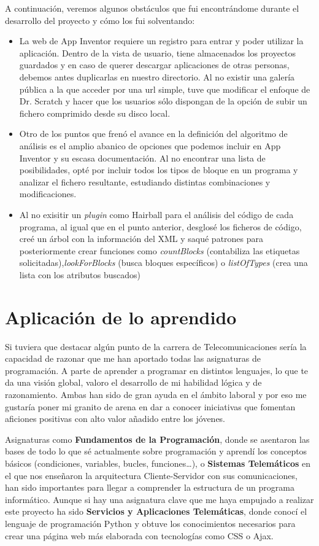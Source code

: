 \documentclass[a4paper, 12pt]{book}
\begin{document}
A continuación, veremos algunos obstáculos que fui encontrándome durante el desarrollo del proyecto y cómo los fui solventando:

\begin{itemize}
	\item La web de App Inventor requiere un registro para entrar y poder utilizar la aplicación. Dentro de la vista de usuario, tiene almacenados los proyectos guardados y en caso de querer descargar aplicaciones de otras personas, debemos antes duplicarlas en nuestro directorio. Al no existir una galería pública a la que acceder por una url simple, tuve que modificar el enfoque de Dr. Scratch y hacer que los usuarios sólo dispongan de la opción de subir un fichero comprimido desde su disco local. 
	\item Otro de los puntos que frenó el avance en la definición del algoritmo de análisis es el amplio abanico de opciones que podemos incluir en App Inventor y su escasa documentación. Al no encontrar una lista de posibilidades, opté por incluir todos los tipos de bloque en un programa y analizar el fichero resultante, estudiando distintas combinaciones y modificaciones. 
	\item Al no exisitir un \textit{plugin} como Hairball para el análisis del código de cada programa, al igual que en el punto anterior, desglosé los ficheros de código, creé un árbol con la información del XML y saqué patrones para posteriormente crear funciones como \textit{countBlocks} (contabiliza las etiquetas solicitadas),\textit{lookForBlocks} (busca bloques específicos) o \textit{listOfTypes} (crea una lista con los atributos buscados)
\end{itemize}

\section{Aplicación de lo aprendido}
\label{sec:aplicacion}
Si tuviera que destacar algún punto de la carrera de Telecomunicaciones sería la capacidad de razonar que me han aportado todas las asignaturas de programación. A parte de aprender a programar en distintos lenguajes, lo que te da una visión global, valoro el desarrollo de mi habilidad lógica y de razonamiento. Ambas han sido de gran ayuda en el ámbito laboral y por eso me gustaría poner mi granito de arena en dar a conocer iniciativas que fomentan aficiones positivas con alto valor añadido entre los jóvenes.  

Asignaturas como \textbf{Fundamentos de la Programación}, donde se asentaron las bases de todo lo que sé actualmente sobre programación y aprendí los conceptos básicos (condiciones, variables, bucles, funciones\ldots), o \textbf{Sistemas Telemáticos} en el que nos enseñaron la arquitectura Cliente-Servidor con sus comunicaciones, han sido importantes para llegar a comprender la estructura de un programa informático. Aunque si hay una asignatura clave que me haya empujado a realizar este proyecto ha sido \textbf{Servicios y Aplicaciones Telemáticas}, donde conocí el lenguaje de programación Python y obtuve los conocimientos necesarios para crear una página web más elaborada con tecnologías como CSS o Ajax. 
\end{document}

